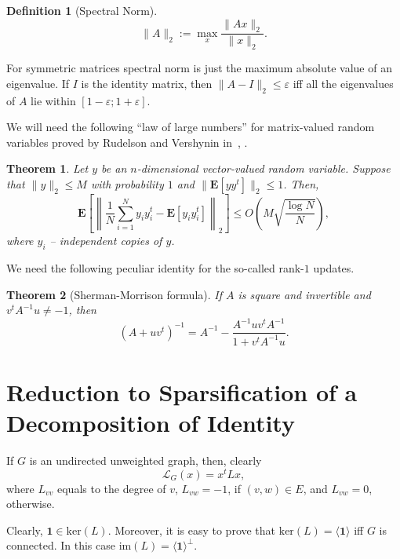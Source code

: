\documentclass[12pt]{article}
\newcommand{\eps}{\varepsilon}
\newtheorem{theorem}{Theorem}
\newtheorem{definition}{Definition}
\begin{document}
    \begin{definition}[Spectral Norm]
        $$
            \|A\|_2 := \max_{x} \frac{\|Ax\|_2}{\|x\|_2}.
        $$
    \end{definition}

    For symmetric matrices spectral norm is just the maximum absolute value of an eigenvalue.
    If $I$ is the identity matrix, then $\|A - I\|_2 \leq \eps$ iff all the eigenvalues of
    $A$ lie within $[1 - \eps; 1 + \eps]$.

    We will need the following ``law of large numbers'' for matrix-valued random variables proved by Rudelson and Vershynin
    in~\cite{R96}, \cite{RV07}.
    \begin{theorem}
        \label{rv_inequality}
        Let $y$ be an $n$-dimensional vector-valued random variable.
        Suppose that $\|y\|_2 \leq M$ with probability $1$ and
        $\|\mathbf{E}[yy^t]\|_2 \leq 1$. Then,
        \begin{equation}
            \label{rv_formula}
            \mathbf{E}\left[\left\|\frac{1}{N} \sum_{i = 1}^{N} y_i y_i^t - \mathbf{E}[y_i y_i^t]\right\|_2\right]
            \leq O\left(M \sqrt{\frac{\log N}{N}}\right),
        \end{equation}
        where $y_i$ -- independent copies of $y$.
    \end{theorem}

    We need the following peculiar identity for the so-called rank-$1$ updates.

    \begin{theorem}[Sherman-Morrison formula]
        \label{sherman_morrison}
        If $A$ is square and invertible and $v^tA^{-1}u \ne -1$, then
        $$
            (A + uv^t)^{-1} = A^{-1} - \frac{A^{-1}uv^tA^{-1}}{1 + v^tA^{-1}u}.
        $$
    \end{theorem}

    \section{Reduction to Sparsification of a Decomposition of Identity}
    \label{reduction_unity}

    If $G$ is an undirected unweighted graph, then, clearly
    $$
        \mathcal{L}_G(x) = x^t L x,
    $$
    where $L_{vv}$ equals to the degree of $v$, $L_{vw} = -1$, if $(v, w) \in E$, and
    $L_{vw} = 0$, otherwise.

    Clearly, $\mathbf{1} \in \mathrm{ker}(L)$. Moreover, it is easy to prove that
    $\mathrm{ker}(L) = \langle \mathbf{1} \rangle$ iff $G$ is connected.
    In this case $\mathrm{im}(L) = \langle\mathbf{1}\rangle^{\perp}$.
\end{document}
